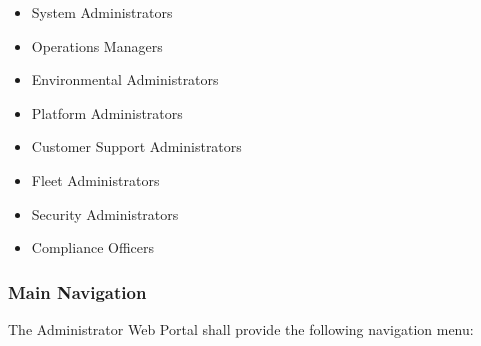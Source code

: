 \begin{itemize}

\item System Administrators

\item Operations Managers

\item Environmental Administrators

\item Platform Administrators

\item Customer Support Administrators

\item Fleet Administrators

\item Security Administrators

\item Compliance Officers

\end{itemize}


\subsubsection*{Main Navigation}

The Administrator Web Portal shall provide the following navigation
menu:

